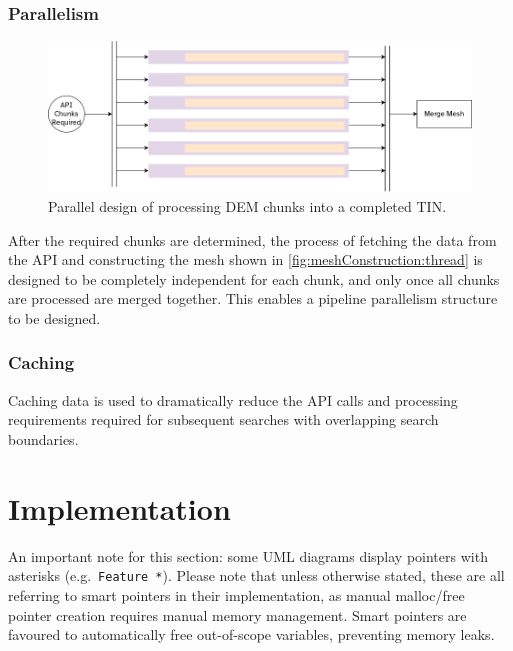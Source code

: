 \documentclass[12pt]{article}
\begin{document}
\subsubsection{Parallelism}

\begin{figure}[!htbp]
  \centering
  \includegraphics[width=1\textwidth]{assets/meshConstruction-parallel.png}
  \caption{Parallel design of processing DEM chunks into a completed TIN.}
\end{figure}

After the required chunks are determined, the process of fetching the data from the API and constructing the mesh shown in \autoref{fig:meshConstruction:thread} is designed to be completely independent for each chunk, and only once all chunks are processed are merged together. This enables a pipeline parallelism structure to be designed.

\subsubsection{Caching}

Caching data is used to dramatically reduce the API calls and processing requirements required for subsequent searches with overlapping search boundaries.


\section{Implementation}

An important note for this section: some UML diagrams display pointers with asterisks (e.g.\ \texttt{Feature *}). Please note that unless otherwise stated, these are all referring to smart pointers in their implementation, as manual malloc/free pointer creation requires manual memory management. Smart pointers are favoured to automatically free out-of-scope variables, preventing memory leaks.

\end{document}
